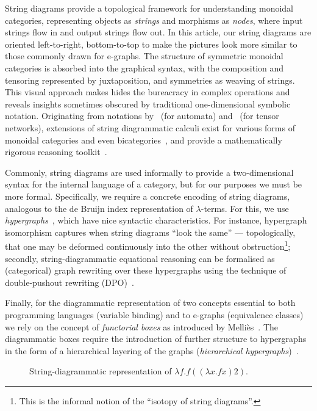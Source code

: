 String diagrams provide a topological framework for understanding monoidal categories, representing objects as \emph{strings} and morphisms as \emph{nodes}, where input strings flow in and output strings flow out.
In this article, our string diagrams are oriented left-to-right, bottom-to-top to make the pictures look more similar to those commonly drawn for e-graphs.
The structure of symmetric monoidal categories is absorbed into the graphical syntax, with the composition and tensoring represented by juxtaposition, and symmetries as weaving of strings.
This visual approach makes hides the bureacracy in complex operations and reveals insights sometimes obscured by traditional one-dimensional symbolic notation.
Originating from notations by~\citet{hotzsd} (for automata) and~\citet{penrose1984spinors} (for tensor networks), extensions of string diagrammatic calculi exist for various forms of monoidal categories and even bicategories~\cite{Selinger_2010}, and provide a mathematically rigorous reasoning toolkit~\cite{joyal_geometry_1991}.

Commonly, string diagrams are used informally to provide a two-dimensional syntax for the internal language of a category, but for our purposes we must be more formal.
Specifically, we require a concrete encoding of string diagrams, analogous to the de Bruijn index representation of $\lambda$-terms.
For this, we use \emph{hypergraphs}~\cite{bonchi_string_2022-1}, which have nice syntactic characteristics.
For instance, hypergraph isomorphism captures when string diagrams \enquote{look the same} --- topologically, that one may be deformed continuously into the other without obstruction\footnote{This is the informal notion of the \enquote{isotopy of string diagrams}.}; secondly, string-diagrammatic equational reasoning can be formalised as (categorical) graph rewriting over these hypergraphs using the technique of double-pushout rewriting (DPO)~\cite{bonchi_string_2022-1}.

Finally, for the diagrammatic representation of two concepts essential to both programming languages (variable binding) and to e-graphs (equivalence classes) we rely on the concept of \emph{functorial boxes} as introduced by Melli\`es~\cite{10.1007/11874683_1}.
The diagrammatic boxes require the introduction of further structure to hypergraphs in the form of a hierarchical layering of the graphs (\emph{hierarchical hypergraphs})~\cite{fscd}.

\begin{figure}
	\centering
	\caption{String-diagrammatic representation of $\lambda f . f ((\lambda x . f x) 2)$.}\label{fig:de-brujin-string}
\end{figure}

